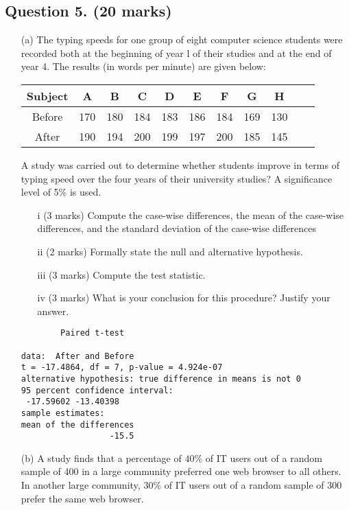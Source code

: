 \newpage
\subsection*{Question 5. (20 marks) }



\begin{itemize}
\item[(a)] The typing speeds for one group of eight computer science students were recorded both at the beginning of year l of their studies and at the end of year 4. The results (in words per minute) are given below:

\begin{center}
\begin{tabular}{|c|c|c|c|c|c|c|c|c|c|c|}
\hline
Subject& A& B& C& D& E &F &G &H \\ \hline
Before & 170& 180& 184& 183& 186& 184 &169 & 130\\ \hline
After & 190 & 194 & 200 & 199 & 197 & 200 & 185& 145\\ \hline

\hline
\end{tabular}
\end{center}

A study was carried out to determine whether students improve in terms of typing speed over the four years of their university studies? A significance level of 5\% is used.

\begin{itemize}
\item[i] (3 marks) Compute the case-wise differences, the mean of the case-wise differences, and the standard deviation of the case-wise differences
\item[ii] (2 marks) Formally state the null and alternative hypothesis.
\item[iii] (3 marks) Compute the test statistic.
\item[iv] (3 marks) What is your conclusion for this procedure? Justify your answer.
\end{itemize}
\begin{framed}
\begin{verbatim}
        Paired t-test

data:  After and Before
t = -17.4864, df = 7, p-value = 4.924e-07
alternative hypothesis: true difference in means is not 0
95 percent confidence interval:
 -17.59602 -13.40398
sample estimates:
mean of the differences
                  -15.5
\end{verbatim}
\end{framed}
\newpage
\item[(b)] A study finds that a percentage of $40\%$ of IT users out of a random sample of 400 in a large
community preferred one web browser to all others. In another large community, $30\%$ of IT users out of a random sample of 300 prefer the same web browser.


\end{itemize}
